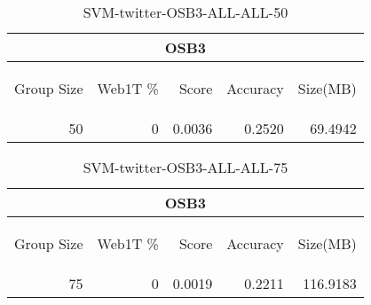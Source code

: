 \begin{center}
\begin{table}[htbp] 
 \begin{center}
\begin{tabular}{ | r | r | r | r | r |}
\hline
\multicolumn{5}{|c|}{OSB3}\\
\hline
\begin{sideways}Group Size\end{sideways} & \begin{sideways}Web1T \%\end{sideways} & \begin{sideways}Score\end{sideways} & \begin{sideways}Accuracy\end{sideways} & \begin{sideways}Size(MB)\end{sideways}\\
\hline
\multirow{0}{*}{50}
 & 0 & 0.0036 & 0.2520 & 69.4942\\ \cline{2-5}
\hline
\end{tabular}
\caption{SVM-twitter-OSB3-ALL-ALL-50}
\label{table:SVM-twitter-OSB3-ALL-ALL-50}
\end{center}
 \end{table}
\end{center}

\begin{center}
\begin{table}[htbp] 
 \begin{center}
\begin{tabular}{ | r | r | r | r | r |}
\hline
\multicolumn{5}{|c|}{OSB3}\\
\hline
\begin{sideways}Group Size\end{sideways} & \begin{sideways}Web1T \%\end{sideways} & \begin{sideways}Score\end{sideways} & \begin{sideways}Accuracy\end{sideways} & \begin{sideways}Size(MB)\end{sideways}\\
\hline
\multirow{0}{*}{75}
 & 0 & 0.0019 & 0.2211 & 116.9183\\ \cline{2-5}
\hline
\end{tabular}
\caption{SVM-twitter-OSB3-ALL-ALL-75}
\label{table:SVM-twitter-OSB3-ALL-ALL-75}
\end{center}
 \end{table}
\end{center}

